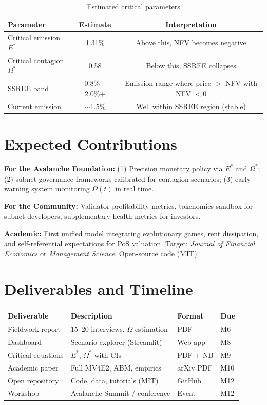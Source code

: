 \documentclass[11pt,a4paper]{article}
\begin{document}
\begin{table}[H]
\centering
\caption{Estimated critical parameters}
\label{tab:params}
\begin{tabular}{lcc}
\toprule
\textbf{Parameter} & \textbf{Estimate} & \textbf{Interpretation} \\
\midrule
Critical emission $E^*$ & 1.31\% & Above this, NFV becomes negative \\
Critical contagion $\Omega^*$ & 0.58 & Below this, SSREE collapses \\
SSREE band & 0.8\% -- 2.0\%+ & Emission range where price $>$ NFV with NFV $< 0$ \\
Current emission & $\sim$1.5\% & Well within SSREE region (stable) \\
\bottomrule
\end{tabular}
\end{table}

\section{Expected Contributions}

\textbf{For the Avalanche Foundation:} (1) Precision monetary policy via $E^*$ and $\Omega^*$; (2) subnet governance frameworks calibrated for contagion scenarios; (3) early warning system monitoring $\Omega(t)$ in real time.

\textbf{For the Community:} Validator profitability metrics, tokenomics sandbox for subnet developers, supplementary health metrics for investors.

\textbf{Academic:} First unified model integrating evolutionary games, rent dissipation, and self-referential expectations for PoS valuation. Target: \emph{Journal of Financial Economics} or \emph{Management Science}. Open-source code (MIT).

\section{Deliverables and Timeline}

\begin{table}[H]
\centering
\begin{tabular}{p{3cm} p{5cm} p{1.5cm} p{1cm}}
\toprule
\textbf{Deliverable} & \textbf{Description} & \textbf{Format} & \textbf{Due} \\
\midrule
Fieldwork report & 15--20 interviews, $\Omega$ estimation & PDF & M6 \\
Dashboard & Scenario explorer (Streamlit) & Web app & M8 \\
Critical equations & $E^*$, $\Omega^*$ with CIs & PDF + NB & M9 \\
Academic paper & Full MV4E2, ABM, empirics & arXiv PDF & M10 \\
Open repository & Code, data, tutorials (MIT) & GitHub & M12 \\
Workshop & Avalanche Summit / conference & Event & M12 \\
\bottomrule
\end{tabular}
\end{table}
\end{document}
